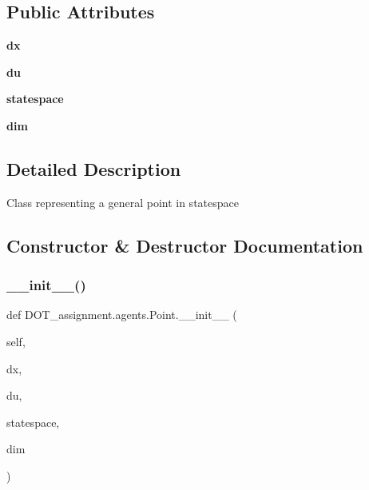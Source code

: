 \subsection*{Public Attributes}
\begin{DoxyCompactItemize}
\item 
\mbox{\label{class_d_o_t__assignment_1_1agents_1_1_point_ad3a41d4ee277be9ec169d79e0c3bed0d}} 
{\bfseries dx}
\item 
\mbox{\label{class_d_o_t__assignment_1_1agents_1_1_point_a435b33da7bf054695335619939e8341d}} 
{\bfseries du}
\item 
\mbox{\label{class_d_o_t__assignment_1_1agents_1_1_point_a225525e00f6afd4f2f7ee1c44a2bc931}} 
{\bfseries statespace}
\item 
\mbox{\label{class_d_o_t__assignment_1_1agents_1_1_point_a42328f86b45800a1f4fde98f068809fc}} 
{\bfseries dim}
\end{DoxyCompactItemize}


\subsection{Detailed Description}
\begin{DoxyVerb}Class representing a general point in statespace
\end{DoxyVerb}
 

\subsection{Constructor \& Destructor Documentation}
\mbox{\label{class_d_o_t__assignment_1_1agents_1_1_point_aa87b4bca83a6edd4a6e153cd5717d5e2}} 
\subsubsection{\texorpdfstring{\_\_init\_\_()}{\_\_init\_\_()}}
{\footnotesize\ttfamily def D\+O\+T\+\_\+assignment.\+agents.\+Point.\+\_\+\+\_\+init\+\_\+\+\_\+ (\begin{DoxyParamCaption}\item[{}]{self,  }\item[{}]{dx,  }\item[{}]{du,  }\item[{}]{statespace,  }\item[{}]{dim }\end{DoxyParamCaption})}

